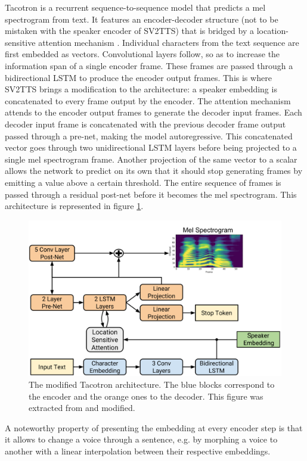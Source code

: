 \documentclass[a4paper, oneside, 12pt, english]{article}
\begin{document}
Tacotron is a recurrent sequence-to-sequence model that predicts a mel spectrogram from text. It features an encoder-decoder structure (not to be mistaken with the speaker encoder of SV2TTS) that is bridged by a location-sensitive attention mechanism \citep{Attention2}. Individual characters from the text sequence are first embedded as vectors. Convolutional layers follow, so as to increase the information span of a single encoder frame. These frames are passed through a bidirectional LSTM to produce the encoder output frames. This is where SV2TTS brings a modification to the architecture: a speaker embedding is concatenated to every frame output by the encoder. The attention mechanism attends to the encoder output frames to generate the decoder input frames. Each decoder input frame is concatenated with the previous decoder frame output passed through a pre-net, making the model autoregressive. This concatenated vector goes through two unidirectional LSTM layers before being projected to a single mel spectrogram frame. Another projection of the same vector to a scalar allows the network to predict on its own that it should stop generating frames by emitting a value above a certain threshold. The entire sequence of frames is passed through a residual post-net before it becomes the mel spectrogram. This architecture is represented in figure \ref{tacotron2_arch}.

\begin{figure}[h]
	\centering
	\includegraphics[width=0.7\linewidth]{images/tacotron2_arch.png}
	\caption{The modified Tacotron architecture. The blue blocks correspond to the encoder and the orange ones to the decoder. This figure was extracted from \citep{Tacotron2} and modified.}
	\label{tacotron2_arch}
\end{figure}


A noteworthy property of presenting the embedding at every encoder step is that it allows to change a voice through a sentence, e.g. by morphing a voice to another with a linear interpolation between their respective embeddings.
\end{document}
